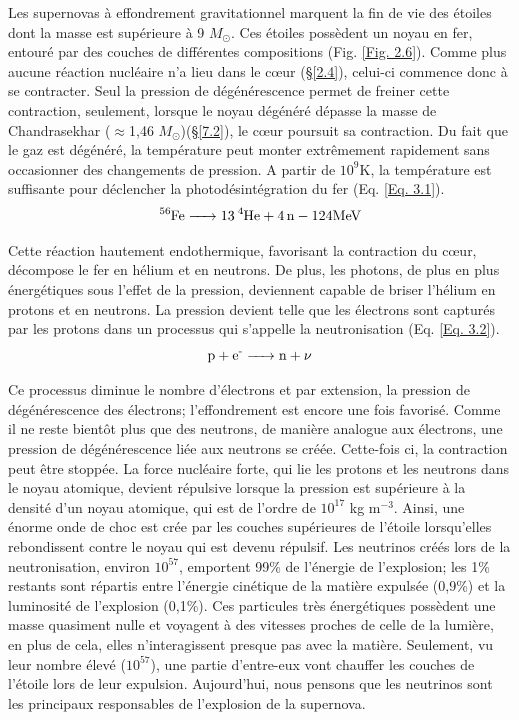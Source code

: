 Les supernovas à effondrement gravitationnel marquent la fin de vie des étoiles dont la masse est supérieure à 9 $M_\odot$. Ces étoiles possèdent un noyau en fer, entouré par des couches de différentes compositions (Fig. \ref{Fig. 2.6}). Comme plus aucune réaction nucléaire n'a lieu dans le cœur (§\ref{2.4}), celui-ci commence donc à se contracter. Seul la pression de dégénérescence permet de freiner cette contraction, seulement, lorsque le noyau dégénéré dépasse la masse de Chandrasekhar ($\approx$1,46 $M_\odot$)(§\ref{7.2}), le cœur poursuit sa contraction. Du fait que le gaz est dégénéré, la température peut monter extrêmement rapidement sans occasionner des changements de pression. A partir de $10^{9}$K, la température est suffisante pour déclencher la photodésintégration du fer (Eq.  \ref{Eq. 3.1}).\begin{equation} \ce{\ce{^{56}Fe} -> \ce{13\ce{^{4}He}} + \ce{4n} - {124MeV}}\label{Eq. 3.1}\end{equation}

Cette réaction hautement endothermique, favorisant la contraction du cœur, décompose le fer en hélium et en neutrons. De plus, les photons, de plus en plus énergétiques sous l'effet de la pression, deviennent capable de briser l'hélium en protons et en neutrons. La pression devient telle que les électrons sont capturés par les protons dans un processus qui s'appelle la neutronisation (Eq. \ref{Eq. 3.2}).\begin{equation} \ce{p + e{^-} -> n + $\nu$\label{Eq. 3.2}}\end{equation}

Ce processus diminue le nombre d'électrons et par extension, la pression de dégénérescence des électrons; l'effondrement est encore une fois favorisé. Comme il ne reste bientôt plus que des neutrons, de manière analogue aux électrons, une pression de dégénérescence liée aux neutrons se créée. Cette-fois ci, la contraction  peut être stoppée. La force nucléaire forte, qui lie les protons et les neutrons dans le noyau atomique, devient répulsive lorsque la pression est supérieure à la densité d'un noyau atomique, qui est de l'ordre de $10^{17}$ kg  m$^{-3}$. Ainsi, une énorme onde de choc est crée par les couches supérieures de l'étoile lorsqu'elles rebondissent contre le noyau qui est devenu répulsif.
Les neutrinos créés lors de la neutronisation, environ $10^{57}$, emportent 99\% de l'énergie de l'explosion; les 1\% restants sont répartis entre l'énergie cinétique de la matière expulsée (0,9\%) et la luminosité de l'explosion (0,1\%). Ces particules très énergétiques possèdent une masse quasiment nulle et voyagent à des vitesses proches de celle de la lumière, en plus de cela, elles n'interagissent presque pas avec la matière. Seulement, vu leur nombre élevé ($10^{57}$), une partie d'entre-eux vont chauffer les couches de l'étoile lors de leur expulsion. Aujourd'hui, nous pensons que les neutrinos sont les principaux responsables de l'explosion de la supernova.\smallskip

